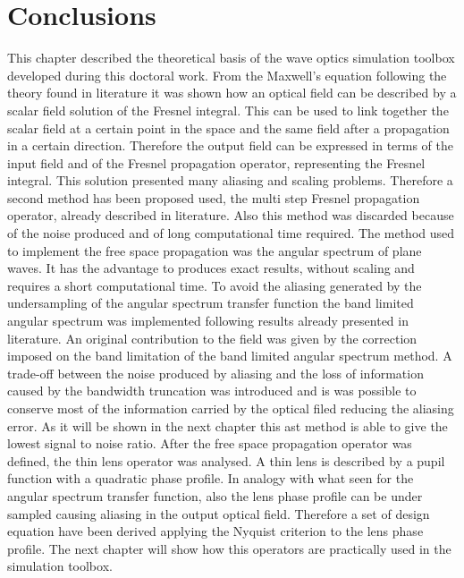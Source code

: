 \section{Conclusions}
This chapter described the theoretical basis of the wave optics simulation toolbox developed during this doctoral work.
From the Maxwell's equation following the theory found in literature it was shown how an optical field can be described by a scalar field solution of the Fresnel integral. This can be used to link together the scalar field at a certain point in the space and the same field after a propagation in a certain direction. Therefore the output field can be expressed in terms of the input field and of the Fresnel propagation operator, representing the Fresnel integral. This solution presented many aliasing and scaling problems. Therefore a second method has been proposed used, the multi step Fresnel propagation operator, already described in literature. Also this method was discarded because of the noise produced and of long computational time required. 
The method used to implement the free space propagation was the angular spectrum of plane waves. It has the advantage to produces exact results, without scaling and requires a short computational time. To avoid the aliasing generated by the undersampling of the angular spectrum transfer function the band limited angular spectrum was implemented following results already presented in literature. An original contribution to the field was given by the correction imposed on the band limitation of the band limited angular spectrum method. A trade-off between the noise produced by aliasing and the loss of information caused by the bandwidth truncation was introduced and is was possible to conserve most of the information carried by the optical filed reducing the aliasing error. As it will be shown in the next chapter this ast method is able to give the lowest signal to noise ratio.
After the free space propagation operator was defined, the thin lens operator was analysed. A thin lens is described by a pupil function with a quadratic phase profile. In analogy with what seen for the angular spectrum transfer function, also the lens phase profile can be under sampled causing aliasing in the output optical field. Therefore a set of design equation have been derived applying the Nyquist criterion to the lens phase profile.
The next chapter will show how this operators are practically used in the simulation toolbox.
 